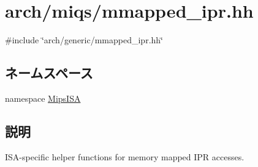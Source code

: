 \hypertarget{miqs_2mmapped__ipr_8hh}{
\section{arch/miqs/mmapped\_\-ipr.hh}
\label{miqs_2mmapped__ipr_8hh}
}
{\ttfamily \#include \char`\"{}arch/generic/mmapped\_\-ipr.hh\char`\"{}}\par
\subsection*{ネームスペース}
\begin{DoxyCompactItemize}
\item 
namespace \hyperlink{namespaceMipsISA}{MipsISA}
\end{DoxyCompactItemize}


\subsection{説明}
ISA-\/specific helper functions for memory mapped IPR accesses. 